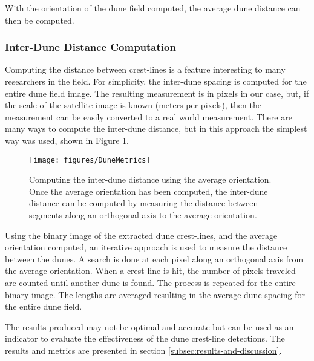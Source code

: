 With the orientation of the dune field computed, the average dune distance can then be computed.

\subsubsection{Inter-Dune Distance Computation}
Computing the distance between crest-lines is a feature interesting to many researchers in the field. For simplicity, the inter-dune spacing is computed for the entire dune field image. The resulting measurement is in pixels in our case, but, if the scale of the satellite image is known (meters per pixels), then the measurement can be easily converted to a real world measurement. There are many ways to compute the inter-dune distance, but in this approach the simplest way was used, shown in Figure \ref{fig:inter-dune-distance-computation}. 

\begin{figure}
	\centering
	\texttt{[image: figures/DuneMetrics]}
	\caption{ Computing the inter-dune distance using the average orientation. Once the average orientation has been computed, the inter-dune distance can be computed by measuring the distance between segments along an orthogonal axis to the average orientation.}
	\label{fig:inter-dune-distance-computation}
\end{figure}

Using the binary image of the extracted dune crest-lines, and the average orientation computed, an iterative approach is used to measure the distance between the dunes. A search is done at each pixel along an orthogonal axis from the average orientation. When a crest-line is hit, the number of pixels traveled are counted until another dune is found. The process is repeated for the entire binary image. The lengths are averaged resulting in the average dune spacing for the entire dune field.

The results produced may not be optimal and accurate but can be used as an indicator to evaluate the effectiveness of the dune crest-line detections. The results and metrics are presented in section \ref{subsec:results-and-discussion}.










